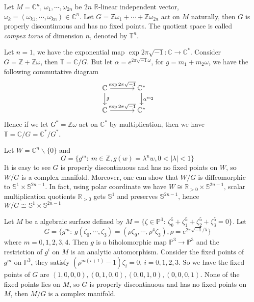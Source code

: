 \begin{eg}
    Let $M=\mathbb{C}^n$, $\omega_1,\cdots,\omega_{2n}$ be $2n$ $\mathbb{R}$-linear independent vector, $\omega_k=(\omega_{k1},\cdots,\omega_{kn})\in\mathbb{C}^n$.
    Let $G=\mathbb{Z}\omega_1+\cdots+\mathbb{Z}\omega_{2n}$ act on $M$ naturally, then $G$ is properly discontinuous and has no fixed points.
    The quotient space is called \emph{compex torus} of dimension $n$, denoted by $\mathbb{T}^n$.

    Let $n=1$, we have the exponential map $\exp{2\pi\sqrt{-1}}:\mathbb{C}\to\mathbb{C}^*$.
    Consider $G=\mathbb{Z}+\mathbb{Z}\omega$, then $\mathbb{T}=\mathbb{C}/G$.
    But let $\alpha=e^{2\pi\sqrt{-1}\omega}$, for $g=m_1+m_2\omega$, we have the following commutative diagram
    \[\begin{tikzcd}
        \mathbb{C} \ar[r, "\exp{2\pi\sqrt{-1}}"] \ar[d, "g"] &[4mm] \mathbb{C}^* \ar[d, "\alpha^{m_2}"] \\
        \mathbb{C} \ar[r, "\exp{2\pi\sqrt{-1}}"] &[4mm] \mathbb{C}^*
    \end{tikzcd}\]
    Hence if we let $G^*=\mathbb{Z}\omega$ act on $\mathbb{C}^*$ by multiplication, then we have $\mathbb{T}=\mathbb{C}/G=\mathbb{C}^*/G^*$.
\end{eg}

\begin{eg}
    Let $W=\mathbb{C}^n\backslash\{0\}$ and
    \[G=\{g^m:\ m\in\mathbb{Z},g(w)=\lambda^nw,0<|\lambda|<1\}\]
    It is easy to see $G$ is properly discontinuous and has no fixed points on $W$, so $W/G$ is a complex manifold.
    Moreover, one can show that $W/G$ is diffeomorphic to $\mathbb{S}^1\times\mathbb{S}^{2n-1}$.
    In fact, using polar coordinate we have $W\cong\mathbb{R}_{>0}\times\mathbb{S}^{2n-1}$, scalar multiplication quotients $\mathbb{R}_{>0}$ gets $\mathbb{S}^1$ and preserves $\mathbb{S}^{2n-1}$, hence $W/G\cong\mathbb{S}^1\times\mathbb{S}^{2n-1}$
\end{eg}

\begin{eg}
    Let $M$ be a algebraic surface defined by $M=\{\zeta\in\mathbb{P}^3:\ \zeta_0^5+\zeta_1^5+\zeta_2^5+\zeta_3^5=0\}$.
    Let
    \[G=\{g^m:\ g(\zeta_0,\cdots,\zeta_3)=(\rho\zeta_0,\cdots,\rho^4\zeta_3),\rho=e^{2\pi\sqrt{-1}/5}\}\]
    where $m=0,1,2,3,4$.
    Then $g$ is a biholomorphic map $\mathbb{P}^3\to\mathbb{P}^3$ and the restriction of $g^i$ on $M$ is an analytic automorphism.
    Consider the fixed points of $g^m$ on $\mathbb{P}^3$, they satisfy $(\rho^{m(i+1)}-1)\zeta_i=0$, $i=0,1,2,3$.
    So we have the fixed points of $G$ are $(1,0,0,0),(0,1,0,0),(0,0,1,0),(0,0,0,1)$.
    None of the fixed points lies on $M$, so $G$ is properly discontinuous and has no fixed points on $M$, then $M/G$ is a complex manifold.
\end{eg}

